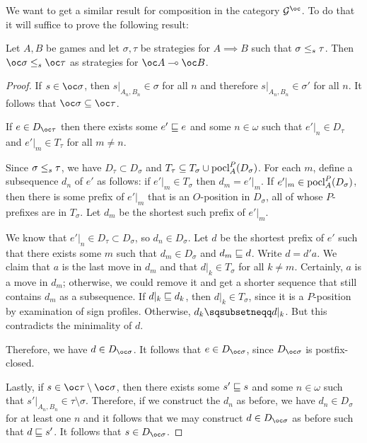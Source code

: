 \documentclass{article}
\begin{document}
We want to get a similar result for composition in the category $\G^{\oc}$.  To do that it will suffice to prove the following result:

\begin{proposition}
  \label{exponentiationMonotonicSO}
  Let $A,B$ be games and let $\sigma,\tau$ be strategies for $A\implies B$ such that $\sigma{\;\le_s\;}\tau$.  Then $\oc\sigma\stle\oc\tau$ as strategies for $\oc A\implies \oc B$.
  \begin{proof}
    If $s\in\oc\sigma$, then $s\vert_{A_n,B_n}\in\sigma$ for all $n$ and therefore $s\vert_{A_n,B_n}\in\sigma'$ for all $n$.  It follows that $\oc\sigma\subset\oc\tau$.

    If $e\in D_{\oc\tau}$ then there exists some $e'\sqsubseteq e$ and some $n\in\omega$ such that $e'\vert_n\in D_\tau$ and $e'\vert_m\in T_\tau$ for all $m\ne n$.  

    Since $\sigma{\;\le_s\;}\tau$, we have $D_\tau\subset D_\sigma$ and $T_\tau\subseteq T_\sigma\cup \operatorname{pocl}_A^P(D_\sigma)$.  For each $m$, define a subsequence $d_n$ of $e'$ as follows: if $e'\vert_m\in T_\sigma$ then $d_m=e'\vert_m$.  If $e'\vert_m\in \operatorname{pocl}_A^P(D_\sigma)$, then there is some prefix of $e'\vert_m$ that is an $O$-position in $D_\sigma$, all of whose $P$-prefixes are in $T_\sigma$.  Let $d_m$ be the shortest such prefix of $e'\vert_m$.

    We know that $e'\vert_n\in D_\tau\subset D_\sigma$, so $d_n\in D_\sigma$.  Let $d$ be the shortest prefix of $e'$ such that there exists some $m$ such that $d_m\in D_\sigma$ and $d_m\sqsubseteq d$.  Write $d=d'a$.  We claim that $a$ is the last move in $d_m$ and that $d\vert_k\in T_\sigma$ for all $k\neq m$.  Certainly, $a$ is a move in $d_m$; otherwise, we could remove it and get a shorter sequence that still contains $d_m$ as a subsequence.  If $d\vert_k\sqsubseteq d_k$, then $d\vert_k\in T_\sigma$, since it is a $P$-position by examination of sign profiles.  Otherwise, $d_k\pprefix d\vert_k$.  But this contradicts the minimality of $d$.  

    Therefore, we have $d\in D_{\oc\sigma}$.  It follows that $e\in D_{\oc\sigma}$, since $D_{\oc\sigma}$ is postfix-closed.

    Lastly, if $s\in \oc\tau\setminus\oc\sigma$, then there exists some $s'\sqsubseteq s$ and some $n\in\omega$ such that $s'\vert_{A_n,B_n}\in\tau\setminus\sigma$.  Therefore, if we construct the $d_n$ as before, we have $d_n\in D_\sigma$ for at least one $n$ and it follows that we may construct $d\in D_{\oc\sigma}$ as before such that $d\sqsubseteq s'$.  It follows that $s\in D_{\oc\sigma}$.  
  \end{proof}
\end{proposition}
\end{document}
